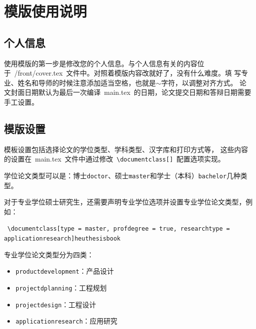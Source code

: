 
%
%
%

\chapter{模版使用说明}
\label{chap03}

\section{个人信息}

使用模版的第一步是修改您的个人信息。与个人信息有关的内容位
于~{/front/cover.tex}~文件中。对照着模版内容改就好了，没有什么难度。填
写专业、姓名和导师的时候注意添加适当空格，也就是$\sim$字符，以调整对齐方式。
论文封面日期默认为最后一次编译~main.tex~的日期，论文提交日期和答辩日期需要手工设置。

\section{模版设置}

模板设置包括选择论文的学位类型、学科类型、汉字库和打印方式等，
这些内容的设置在~main.tex~文件中通过修改~\texttt{\textbackslash documentclass[]}~配置选项实现。

学位论文类型可以是：博士\texttt{doctor}、硕士\texttt{master}和学士（本科）\texttt{bachelor}几种类型。

对于专业学位硕士研究生，还需要声明专业学位选项并设置专业学位论文类型，例如：

~\texttt{\textbackslash documentclass[type = master, profdegree = true, researchtype = applicationresearch]{heuthesisbook}}

专业学位论文类型分为四类：
\begin{itemize}
  \item \texttt{productdevelopment}：产品设计
  \item \texttt{projectdplanning}：工程规划
  \item \texttt{projectdesign}：工程设计
  \item \texttt{applicationresearch}：应用研究
\end{itemize}


